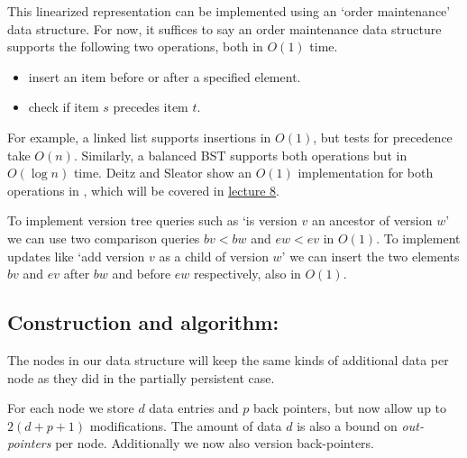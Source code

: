 \documentclass[11pt]{article}
\begin{document}
This linearized representation can be implemented using an `order maintenance' data structure. For now, it suffices to say an order maintenance data structure supports the following two operations, both in \(O(1)\) time.

\begin{itemize}
\item insert an item  before or after a specified element.
\item check if item $s$ precedes item $t$. 
\end{itemize}

For example, a linked list supports insertions in \(O(1)\), but tests for precedence take \(O(n)\). Similarly, a balanced BST supports both operations but in \(O(\log{n})\) time.  Deitz and Sleator show an \(O(1)\) implementation for both operations in \cite{dietz}, which will be covered in \href{http://courses.csail.mit.edu/6.851/spring12/lectures/L08.html}{lecture 8}.

To implement version tree queries such as `is version $v$ an ancestor of version $w$' we can use two comparison queries $bv < bw$ and $ew < ev$ in \(O(1)\). To implement  updates like  `add version $v$ as a child of version $w$' we can insert the two elements $bv$ and $ev$ after $bw$ and before $ew$ respectively, also in \(O(1)\). 

\subsection{Construction and algorithm:}

The nodes in our data structure will keep the same kinds of additional data per node as they did in the partially persistent case. 

For each node we store $d$ data entries and $p$ back pointers, but now allow up to $2(d+p+1)$ modifications. The amount of data $d$ is also a bound on {\em out-pointers} per node. Additionally we now also version back-pointers.
\end{document}
